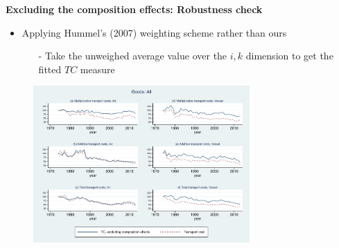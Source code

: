 \documentclass[10 pt,Helvetica, french]{beamer}
\begin{document}
\begin{frame}[label = app_compeffects_Hummels_rob]
\textbf{Excluding the composition effects: Robustness check}
\begin{itemize}
\item Applying Hummel's (2007) weighting scheme rather than ours
\begin{itemize}
\item[-] Take the unweighed average value over the $i,k$ dimension to get the fitted $TC$ measure
\end{itemize}
\end{itemize}
\begin{figure}[htbp]
\begin{center}
\includegraphics[height=6cm]
{graph_composition_all_np.pdf}
\end{center}
\end{figure}

\hyperlink{slide_compeffects_figure}{}
\end{frame}
\end{document}
